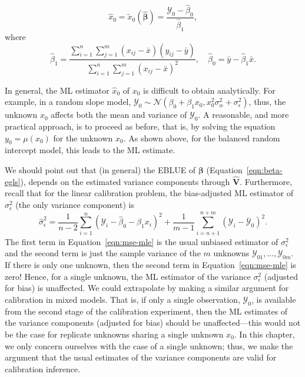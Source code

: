 \documentclass[cmfont,usenames,dvipsnames,leqno]{afit-etd}\usepackage[]{graphicx}\usepackage[]{color}
\newcommand{\mc}[1]{\ensuremath{\mathcal{#1}}}
\newcommand{\wh}[1]{\ensuremath{\widehat{#1}}}
\begin{document}
\begin{equation*}
  \wh{x}_0 = \widetilde{x}_0\left(\wh{\bm{\beta}}\right) = \frac{\mc{Y}_0 - \wh{\beta}_0}{\wh{\beta}_1},
\end{equation*}
where 
\begin{equation*}
  \wh{\beta}_1 = \frac{\sum_{i=1}^n\sum_{j=1}^m\left(x_{ij}-\bar{x}\right)\left(y_{ij}-\bar{y}\right)}{\sum_{i=1}^n\sum_{j=1}^m\left(x_{ij}-\bar{x}\right)^2}, \quad \wh{\beta}_0 = \bar{y} - \wh{\beta}_1\bar{x}.
\end{equation*}

In general, the \ac{ML} estimator $\wh{x}_0$ of $x_0$ is difficult to obtain analytically. For example, in a random slope model, $\mc{Y}_0 \sim \mc{N}\left(\beta_0 + \beta_1 x_0, x_0^2\sigma_\alpha^2 + \sigma_\epsilon^2\right)$, thus, the unknown $x_0$ affects both the mean and variance of $\mc{Y}_0$. A reasonable, and more practical approach, is to proceed as before, that is, by solving the equation $y_0 = \mu(x_0)$ for the unknown $x_0$. As shown above, for the balanced random intercept model, this leads to the \ac{ML} estimate.

We should point out that (in general) the \ac{EBLUE} of $\bm{\beta}$ (Equation~\eqref{eqn:beta-egls}), depends on the estimated variance components through $\wh{\bm{V}}$. Furthermore, recall that for the linear calibration problem, the bias-adjusted \ac{ML} estimator of $\sigma_\epsilon^2$ (the only variance component) is 
\begin{equation}
\label{eqn:mse-mle}
  \wh{\sigma}_\epsilon^2 = \frac{1}{n-2}\sum_{i=1}^n\left(\mc{Y}_i-\wh{\beta}_0-\wh{\beta}_1 x_i\right)^2 + \frac{1}{m-1}\sum_{i=n+1}^{n+m}\left(\mc{Y}_i-\overline{\mc{Y}}_0\right)^2.
\end{equation}
The first term in Equation~\eqref{eqn:mse-mle} is the usual unbiased estimator of $\sigma_\epsilon^2$ and the second term is just the sample variance of the $m$ unknowns $\mc{Y}_{01}, \dotsc, \mc{Y}_{0m}$. If there is only one unknown, then the second term in Equation~\eqref{eqn:mse-mle} is zero! Hence, for a single unknown, the \ac{ML} estimator of the variance $\sigma_\epsilon^2$ (adjusted for bias) is unaffected. We could extrapolate by making a similar argument for calibration in mixed models. That is, if only a single observation, $\mc{Y}_0$, is available from the second stage of the calibration experiment, then the \ac{ML} estimates of the variance components (adjusted for bias) should be unaffected---this would not be the case for replicate unknowns sharing a single unknown $x_0$. In this chapter, we only concern ourselves with the case of a single unknown; thus, we make the argument that the usual estimates of the variance components are valid for calibration inference. 
\end{document}
